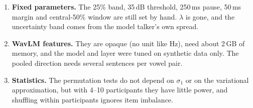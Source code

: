 \documentclass[11pt]{article}
\begin{document}
\begin{enumerate}[leftmargin=*,label=\arabic*.]
\item \textbf{Fixed parameters.} The 25\% band, 35\,dB threshold, 250\,ms pause, 50\,ms margin and central-50\% window are still set by hand. $\lambda$ is gone, and the uncertainty band comes from the model talker's own spread.

\item \textbf{WavLM features.} They are opaque (no unit like Hz), need about 2\,GB of memory, and the model and layer were tuned on synthetic data only. The pooled direction needs several sentences per vowel pair.

\item \textbf{Statistics.} The permutation tests do not depend on $\sigma_1$ or on the variational approximation, but with 4--10 participants they have little power, and shuffling within participants ignores item imbalance.
\end{enumerate}
\end{document}
